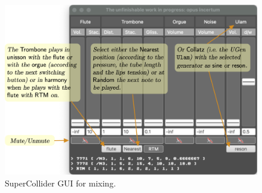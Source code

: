 \documentclass{article}
\begin{document}
\begin{figure}[H]
\centering
\includegraphics[width=\textwidth]{../img/9932}
\caption{SuperCollider GUI for mixing.}
\label{guiemix}
\end{figure}
\end{document}
